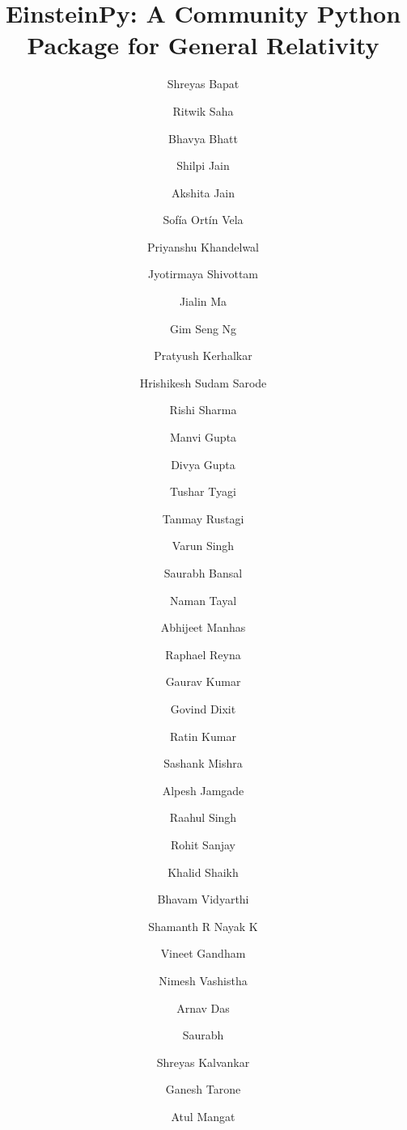 \documentclass[onecolumn]{aa}
\begin{document}
 


   \title{EinsteinPy: A Community Python Package for General Relativity}

   \subtitle{}

   \author{
Shreyas Bapat\inst{\ref{inst:iitm}}  %
  \and
Ritwik Saha\inst{\ref{inst:iitm}}  %
  \and
Bhavya Bhatt\inst{\ref{inst:iitm}}  %
\and
Shilpi Jain\inst{\ref{inst:iitr}}
\and
Akshita Jain\inst{\ref{inst:iitm}}
\and
Sofía Ortín Vela\inst{\ref{inst:uz}}
\and
Priyanshu Khandelwal\inst{\ref{inst:iitm}}
\and
Jyotirmaya Shivottam\inst{\ref{inst:niser}}
\and
Jialin Ma\inst{\ref{inst:gatech}}
\and
Gim Seng Ng\inst{\ref{inst:trinity}}
\and
Pratyush Kerhalkar\inst{\ref{inst:elecmani}}
\and
Hrishikesh Sudam Sarode\inst{\ref{inst:iitm}}
\and
Rishi Sharma\inst{\ref{inst:iitm}}
\and
Manvi Gupta\inst{\ref{inst:iitm}}
\and
Divya Gupta\inst{\ref{inst:iitm}}
\and
Tushar Tyagi\inst{\ref{inst:iitm}}
\and
Tanmay Rustagi\inst{\ref{inst:iitm}}
\and
Varun Singh\inst{\ref{inst:iitm}}
\and
Saurabh Bansal\inst{\ref{inst:iitm}}
\and
Naman Tayal\inst{\ref{inst:iitm}}
\and
Abhijeet Manhas\inst{\ref{inst:iitm}}
\and
Raphael Reyna\inst{\ref{inst:calpoly}}
\and
Gaurav Kumar\inst{\ref{inst:iitm}}
\and
Govind Dixit\inst{\ref{inst:iiitl}}
\and
Ratin Kumar\inst{\ref{inst:nitk}}
\and
Sashank Mishra\inst{\ref{inst:iiita}}
\and
Alpesh Jamgade\inst{\ref{inst:bharath}}
\and
Raahul Singh\inst{\ref{inst:sri}}
\and
Rohit Sanjay\inst{\ref{inst:manipal}}
\and
Khalid Shaikh\inst{\ref{inst:yadav}}
\and
Bhavam Vidyarthi\inst{\ref{inst:manipal}}
\and
Shamanth R Nayak K\inst{\ref{inst:manipalit}}
\and
Vineet Gandham\inst{\ref{inst:manipalcs}}
\and
Nimesh Vashistha\inst{\ref{inst:manipal}}
\and
Arnav Das\inst{\ref{inst:hira}}
\and
Saurabh\inst{\ref{inst:du}}
\and
Shreyas Kalvankar\inst{\ref{inst:wagh}}
\and
Ganesh Tarone\inst{\ref{inst:vish}}
\and
Atul Mangat\inst{\ref{inst:iitree}}
}
\end{document}
